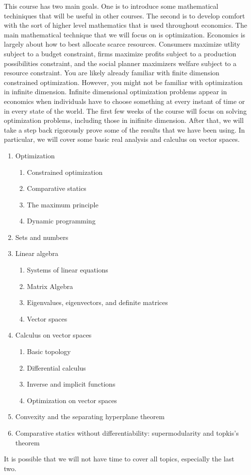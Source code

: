 \documentclass[10pt]{article}
\begin{document}
This course has two main goals. One is to introduce some mathematical
techiniques that will be useful in other courses. The second is to
develop comfort with the sort of higher level mathematics that is used
throughout economics. The main mathematical technique that we will
focus on is optimization. Economics is largely about how to best
allocate scarce resources. Consumers maximize utlity subject to a
budget constraint, firms maximize profits subject to a production
possibilities constraint, and the social planner maximizers welfare
subject to a resource constraint. You are likely already familiar with
finite dimension constrained optimization. However, you might not
be familiar with optimization in infinite dimension. Infinite
dimensional optimization problems appear in economics when individuals
have to choose something at every instant of time or in every state of
the world. The first few weeks of the course will focus on solving
optimization problems, including those in inifinite dimension. 
After that, we will take a step back rigorously prove some of the
results that we have been using. In particular, we will cover some
basic real analysis and calculus on vector spaces. 

\begin{enumerate}
\item Optimization
  \begin{enumerate}
  \item Constrained optimization
  \item Comparative statics
  \item The maximum principle
  \item Dynamic programming
  \end{enumerate}
\item Sets and numbers
\item Linear algebra
  \begin{enumerate}
  \item Systems of linear equations 
  \item Matrix Algebra 
  \item Eigenvalues, eigenvectors, and definite matrices 
  \item Vector spaces
  \end{enumerate}
\item Calculus on vector spaces
  \begin{enumerate}
  \item Basic topology 
  \item Differential calculus 
  \item Inverse and implicit functions
  \item Optimization on vector spaces
  \end{enumerate}
\item Convexity and the separating hyperplane theorem
\item Comparative statics without differentiability: supermodularity
  and topkis's theorem 
\end{enumerate}
It is possible that we will not have time to cover all topics,
especially the last two.

\clearpage


\end{document}
